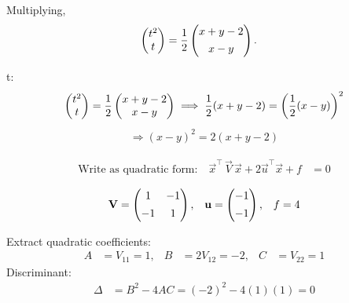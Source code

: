 \documentclass{beamer}
\numberwithin{equation}{section}
\begin{document}
Multiplying,
\begin{align}
\begin{pmatrix}t^2\\t\end{pmatrix}
&= 
\frac{1}{2}
\begin{pmatrix}x+y-2\\[4pt]x-y\end{pmatrix}.
\end{align}

 t:
\begin{align}
\begin{pmatrix}t^2\\t\end{pmatrix}
= \frac{1}{2}\begin{pmatrix}x+y-2\\x-y\end{pmatrix}
\implies
\frac{1}{2}(x+y-2)
= \left(\frac{1}{2}(x-y)\right)^2
\end{align}
\begin{align}
\Rightarrow (x-y)^2 = 2(x+y-2)
\end{align}

\begin{align}
\text{Write as quadratic form:}\quad
\vec{x}^\top \, \vec{V}\, \vec{x} + 2\vec{u}^\top\vec{x} + f &= 0
\end{align}

\begin{align}
\mathbf{V} &= \begin{pmatrix}1 & -1\\[4pt]-1 & 1\end{pmatrix}, &
\mathbf{u} &= \begin{pmatrix}-1\\[4pt]-1\end{pmatrix}, &
f = 4
\end{align}

Extract quadratic coefficients:
\begin{align}
A &= V_{11} = 1, & B &= 2V_{12} = -2, & C &= V_{22} = 1
\end{align}
Discriminant:
\begin{align}
\Delta &= B^2 - 4AC = (-2)^2 - 4(1)(1) = 0
\end{align}
\end{document}
